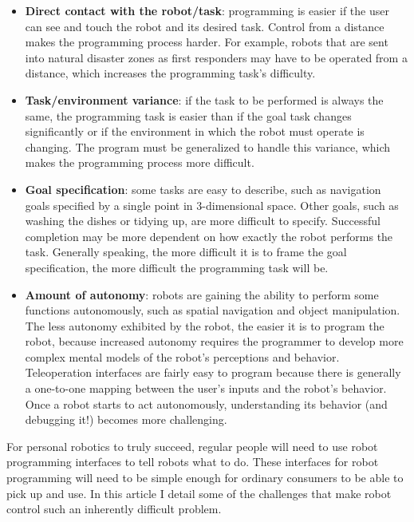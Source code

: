 \documentclass[10pt,twocolumn]{article}
\begin{document}
\begin{itemize}
\item {\bf Direct contact with the robot/task}: programming is easier if the user can see and touch the robot and its desired task. Control from a distance makes the programming process harder. For example, robots that are sent into natural disaster zones as first responders may have to be operated from a distance, which increases the programming task's difficulty.

\item {\bf Task/environment variance}: if the task to be performed is always the same, the programming task is easier than if the goal task changes significantly or if the environment in which the robot must operate is changing. The program must be generalized to handle this variance, which makes the programming process more difficult.

\item {\bf Goal specification}: some tasks are easy to describe, such as navigation goals specified by a single point in 3-dimensional space. Other goals, such as washing the dishes or tidying up, are more difficult to specify. Successful completion may be more dependent on how exactly the robot performs the task. Generally speaking, the more difficult it is to frame the goal specification, the more difficult the programming task will be.

\item {\bf Amount of autonomy}: robots are gaining the ability to perform some functions autonomously, such as spatial navigation and object manipulation.  The less autonomy exhibited by the robot, the easier it is to program the robot, because increased autonomy requires the programmer to develop more complex mental models of the robot's perceptions and behavior. Teleoperation interfaces are fairly easy to program because there is generally a one-to-one mapping between the user's inputs and the robot's behavior. Once a robot starts to act autonomously, understanding its behavior (and debugging it!) becomes more challenging.
\end{itemize}

For personal robotics to truly succeed, regular people will need to use robot programming interfaces to tell robots what to do. These interfaces for robot programming will need to be simple enough for ordinary consumers to be able to pick up and use. In this article I detail some of the challenges that make robot control such an inherently difficult problem.
\end{document}
